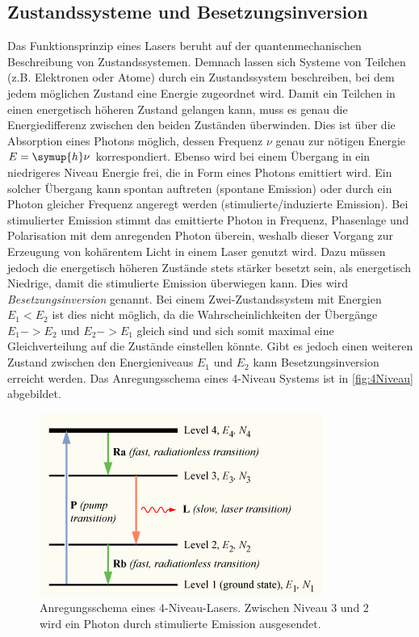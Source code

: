 \subsection{Zustandssysteme und Besetzungsinversion}
Das Funktionsprinzip eines Lasers beruht auf der quantenmechanischen Beschreibung von Zustandssystemen. Demnach lassen sich Systeme von Teilchen (z.B. Elektronen oder Atome)
durch ein Zustandssystem beschreiben, bei dem jedem möglichen Zustand eine Energie zugeordnet wird. Damit ein Teilchen in einen energetisch höheren Zustand gelangen kann,
muss es genau die Energiedifferenz zwischen den beiden Zuständen überwinden. Dies ist über die Absorption eines Photons möglich, dessen Frequenz $\nu$ genau zur nötigen 
Energie $E = \symup{h}\nu$ korrespondiert. Ebenso wird bei einem Übergang in ein niedrigeres Niveau Energie frei, die in Form eines Photons emittiert wird. Ein solcher 
Übergang kann spontan auftreten (spontane Emission) oder durch ein Photon gleicher Frequenz angeregt werden (stimulierte/induzierte Emission). Bei stimulierter Emission
stimmt das emittierte Photon in Frequenz, Phasenlage und Polarisation mit dem anregenden Photon überein, weshalb dieser Vorgang zur Erzeugung von kohärentem Licht in einem 
Laser genutzt wird. Dazu müssen jedoch die energetisch höheren Zustände stets stärker besetzt sein, als energetisch Niedrige, damit die stimulierte Emission überwiegen kann. 
Dies wird \textit{Besetzungsinversion} genannt. Bei einem Zwei-Zustandssystem mit Energien $E_1 < E_2$ ist dies nicht möglich, da die Wahrscheinlichkeiten der Übergänge
$E_1 -> E_2$ und $E_2 -> E_1$ gleich sind und sich somit maximal eine Gleichverteilung auf die Zustände einstellen könnte. Gibt es jedoch einen weiteren Zustand zwischen
den Energieniveaus $E_1$ und $E_2$ kann Besetzungsinversion erreicht werden. Das Anregungsschema eines 4-Niveau Systems ist in \autoref{fig:4Niveau} abgebildet.
\begin{figure}
    \centering
    \includegraphics[scale=0.58]{content/pics/Population-inversion-4level.png}
    \caption{Anregungsschema eines 4-Niveau-Lasers. Zwischen Niveau 3 und 2 wird ein Photon durch stimulierte Emission ausgesendet. \cite{wikipedia_population_inversion}}
    \label{fig:4Niveau}
\end{figure}

